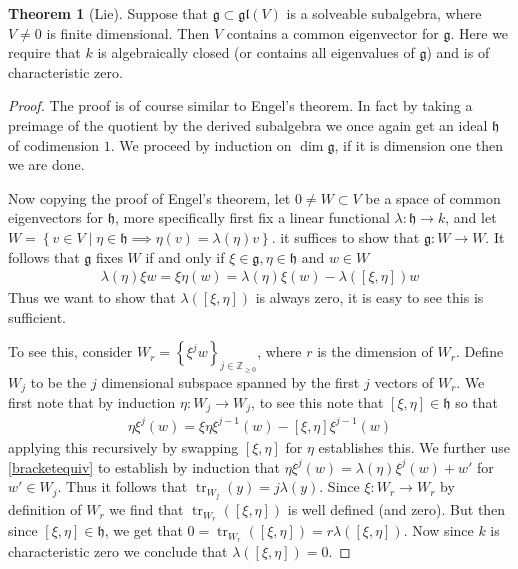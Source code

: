 \documentclass[10.5pt]{article}
\theoremstyle{definition}
\newtheorem{theorem}{Theorem}
\numberwithin{example}{subsection}
\numberwithin{proposition}{subsection}
\numberwithin{pb}{subsection}
\newcommand{\set}[1]{\left\{#1\right\}}
\newcommand{\tand}{\text{ and }}
\begin{document}
        \begin{theorem}[Lie]\label{liestheorem}
            Suppose that \(\mathfrak{g} \subset \mathfrak{gl}(V)\) is a solveable subalgebra, where \(V \neq 0\) is finite dimensional. Then \(V\) contains a common eigenvector for \(\mathfrak{g}\). Here we require that \(k\) is algebraically closed (or contains all eigenvalues of \(\mathfrak{g}\)) and is of characteristic zero.

            \begin{proof}
                The proof is of course similar to Engel's theorem. In fact by taking a preimage of the quotient by the derived subalgebra we once again get an ideal \(\mathfrak{h}\) of codimension \(1\). We proceed by induction on \(\dim \mathfrak{g}\), if it is dimension one then we are done.
                
                Now copying the proof of Engel's theorem, let \(0 \neq W \subset V\) be a space of common eigenvectors for \(\mathfrak{h}\), more specifically first fix a linear functional \(\lambda: \mathfrak{h} \to k\), and let \(W = \set{v \in V \mid \eta \in \mathfrak{h} \implies \eta(v) = \lambda(\eta)v}\). it suffices to show that \(\mathfrak{g}: W \to W\). It follows that \(\mathfrak{g}\) fixes \(W\) if and only if \(\xi \in \mathfrak{g}, \eta \in \mathfrak{h} \tand w \in W\)
                \begin{align}
                    \lambda(\eta)\xi w = \xi\eta(w) = \lambda(\eta)\xi(w) - \lambda([\xi,\eta])w
                \end{align}
                Thus we want to show that \(\lambda([\xi,\eta])\) is always zero, it is easy to see this is sufficient.

                To see this, consider \(W_r = \set{\xi^j w}_{j \in \mathbb{Z}_{\geq 0}}\), where \(r\) is the dimension of \(W_r\). Define \(W_j\) to be the \(j\) dimensional subspace spanned by the first \(j\) vectors of \(W_r\). We first note that by induction \(\eta: W_j \to W_j\), to see this note that \([\xi,\eta] \in \mathfrak{h}\) so that
                \begin{align}\label{bracketequiv}
                    \eta \xi^j(w) = \xi \eta \xi^{j-1}(w) - [\xi,\eta]\xi^{j-1}(w)
                \end{align}
                applying this recursively by swapping \([\xi,\eta]\) for \(\eta\) establishes this. We further use \eqref{bracketequiv} to establish by induction that \(\eta \xi^j(w) = \lambda(\eta)\xi^j(w) + w'\) for \(w' \in W_j\). Thus it follows that \(\operatorname{tr}_{W_j}(y) = j \lambda(y)\). Since \(\xi: W_r \to W_r\) by definition of \(W_r\) we find that \(\operatorname{tr}_{W_r}([\xi,\eta])\) is well defined (and zero). But then since \([\xi,\eta] \in \mathfrak{h}\), we get that \(0 = \operatorname{tr}_{W_r}([\xi,\eta]) = r \lambda([\xi,\eta])\). Now since \(k\) is characteristic zero we conclude that \(\lambda([\xi,\eta]) = 0\).
            \end{proof}
        \end{theorem}
\end{document}
